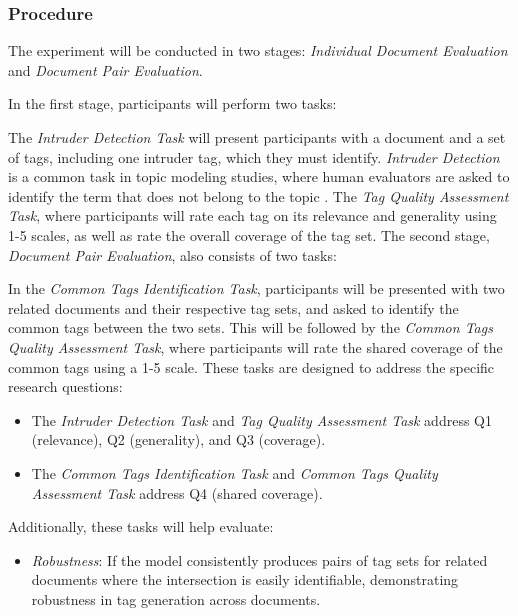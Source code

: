 \subsubsection{Procedure}
The experiment will be conducted in two stages: \textit{Individual Document Evaluation} and \textit{Document Pair Evaluation}.

In the first stage, participants will perform two tasks:

The \textit{Intruder Detection Task} will present participants with a document and a set of tags, including one intruder tag, which they must identify. \textit{Intruder Detection} is a common task in topic modeling studies, where human evaluators are asked to identify the term that does not belong to the topic \cite{chang_reading_2009, newman_evaluating_2010, musil_exploring_2024, lau_machine_2014, bhatia_automatic_2017, hoyle_is_2021}.
The \textit{Tag Quality Assessment Task}, where participants will rate each tag on its relevance and generality using 1-5 scales, as well as rate the overall coverage of the tag set.
The second stage, \textit{Document Pair Evaluation}, also consists of two tasks:

In the \textit{Common Tags Identification Task}, participants will be presented with two related documents and their respective tag sets, and asked to identify the common tags between the two sets.
This will be followed by the \textit{Common Tags Quality Assessment Task}, where participants will rate the shared coverage of the common tags using a 1-5 scale.
These tasks are designed to address the specific research questions:

\begin{itemize}
\item The \textit{Intruder Detection Task} and \textit{Tag Quality Assessment Task} address Q1 (relevance), Q2 (generality), and Q3 (coverage).
\item The \textit{Common Tags Identification Task} and \textit{Common Tags Quality Assessment Task} address Q4 (shared coverage).
\end{itemize}

Additionally, these tasks will help evaluate:

\begin{itemize}
\item \textit{Robustness}: If the model consistently produces pairs of tag sets for related documents where the intersection is easily identifiable, demonstrating robustness in tag generation across documents.
\end{itemize}

